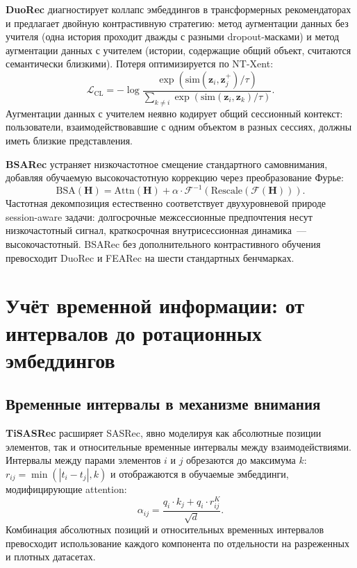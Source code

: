 \textbf{DuoRec} \cite{qiu2022duorec} диагностирует коллапс эмбеддингов в трансформерных рекомендаторах и предлагает двойную контрастивную стратегию: метод аугментации данных без учителя (одна история проходит дважды с разными dropout-масками) и метод аугментации данных с учителем (истории, содержащие общий объект, считаются семантически близкими). 
Потеря оптимизируется по NT-Xent:
\begin{equation}
    \mathcal{L}_\text{CL}
    = -\log
    \frac{
      \exp(\mathrm{sim}(\mathbf{z}_i, \mathbf{z}_j^+) / \tau)
    }{
      \sum_{k \neq i} \exp(\mathrm{sim}(\mathbf{z}_i, \mathbf{z}_k) / \tau)
    }.
\end{equation}
Аугментации данных с учителем неявно кодирует общий сессионный контекст: пользователи, взаимодействовавшие с одним объектом в разных сессиях, должны иметь близкие представления.

\textbf{BSARec} \cite{shin2024bsarec} устраняет низкочастотное смещение стандартного самовнимания, добавляя обучаемую высокочастотную коррекцию через преобразование Фурье:
\begin{equation}
    \mathrm{BSA}(\mathbf{H})
    = \mathrm{Attn}(\mathbf{H})
      + \alpha \cdot \mathcal{F}^{-1}\!\left(\mathrm{Rescale}\!\left(\mathcal{F}(\mathbf{H})\right)\right).
\end{equation}
Частотная декомпозиция естественно соответствует двухуровневой природе session-aware задачи: долгосрочные межсессионные предпочтения несут низкочастотный сигнал, краткосрочная внутрисессионная динамика~--- высокочастотный. BSARec без дополнительного контрастивного обучения превосходит DuoRec и FEARec \cite{du2023fearec} на шести стандартных бенчмарках.

\section{Учёт временной информации: от интервалов до ротационных эмбеддингов}
\label{sec:ch1:temporal}

\subsection{Временные интервалы в механизме внимания}
\label{subsec:ch1:time_intervals}

\textbf{TiSASRec} \cite{li2020tisasrec} расширяет SASRec, явно моделируя как абсолютные позиции элементов, так и относительные временные интервалы между взаимодействиями. 
Интервалы между парами элементов $i$ и $j$ обрезаются до максимума $k$: $r_{ij} = \min(|t_i - t_j|, k)$ и отображаются в обучаемые эмбеддинги, модифицирующие attention:
\begin{equation}
    \alpha_{ij} = \frac{q_i \cdot k_j + q_i \cdot r_{ij}^K}{\sqrt{d}}.
\end{equation}
Комбинация абсолютных позиций и относительных временных интервалов превосходит использование каждого компонента по отдельности на разреженных и плотных датасетах.

